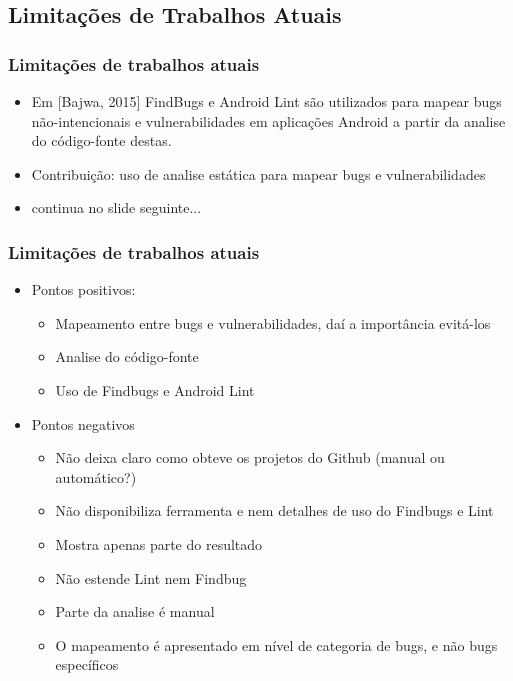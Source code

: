 \documentclass{beamer}
\begin{document}
    \subsection{Limitações de Trabalhos Atuais}
    \frame
    {
        \frametitle{Limitações de trabalhos atuais}
        \begin{itemize}
            \item Em [Bajwa, 2015] FindBugs e Android Lint são utilizados para mapear
            bugs não-intencionais e vulnerabilidades em aplicações Android a partir
            da analise do código-fonte destas.
            \item Contribuição: uso de analise estática para mapear bugs e vulnerabilidades
            \item continua no slide seguinte...
        \end{itemize}
            
    }
    \frame
    {
        \frametitle{Limitações de trabalhos atuais}
        \begin{itemize}
        \item Pontos positivos:
                \begin{itemize}
                    \item Mapeamento entre bugs e vulnerabilidades, daí a importância
                    evitá-los
                    \item Analise do código-fonte
                    \item Uso de Findbugs e Android Lint
                \end{itemize}
            \item Pontos negativos    
                \begin{itemize}
                    \item Não deixa claro como obteve os projetos do Github (manual ou automático?)
                    \item Não disponibiliza ferramenta e nem detalhes de uso do Findbugs e Lint
                    \item Mostra apenas parte do resultado
                    \item Não estende Lint nem Findbug
                    \item Parte da analise é manual
                    \item O mapeamento é apresentado em nível de categoria de bugs,
                    e não bugs específicos
                \end{itemize}
        \end{itemize}
    }
\end{document}
